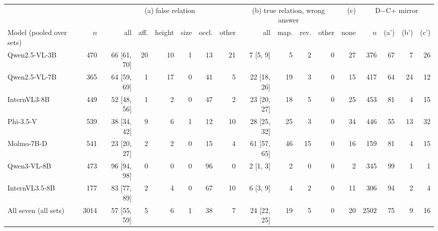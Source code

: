 \begin{tabular}{lr rrrrrr rrrr r rrrr}
\toprule
 & & \multicolumn{6}{c}{(a) false relation} & \multicolumn{4}{c}{(b) true relation, wrong answer} & (c) & \multicolumn{4}{c}{D$-$C+ mirror} \\
\cmidrule(lr){3-8}\cmidrule(lr){9-12}\cmidrule(lr){14-17}
Model (pooled over sets) & $n$ & all & aff. & height & size & occl. & other & all & map. & rev. & other & none & $n$ & (a') & (b') & (c') \\
\midrule
Qwen2.5-VL-3B & 470 & 66 [61, 70] & 20 & 10 & 1 & 13 & 21 & 7 [5, 9] & 5 & 2 & 0 & 27 & 376 & 67 & 7 & 26 \\
Qwen2.5-VL-7B & 365 & 64 [59, 69] & 1 & 17 & 0 & 41 & 5 & 22 [18, 26] & 19 & 3 & 0 & 15 & 417 & 64 & 24 & 12 \\
InternVL3-8B & 449 & 52 [48, 56] & 1 & 2 & 0 & 47 & 2 & 23 [20, 27] & 18 & 5 & 0 & 25 & 453 & 81 & 4 & 15 \\
Phi-3.5-V & 539 & 38 [34, 42] & 9 & 6 & 1 & 12 & 10 & 28 [25, 32] & 25 & 3 & 0 & 34 & 446 & 55 & 13 & 32 \\
Molmo-7B-D & 541 & 23 [20, 27] & 2 & 2 & 0 & 15 & 4 & 61 [57, 65] & 46 & 15 & 0 & 16 & 159 & 81 & 4 & 15 \\
Qwen3-VL-8B & 473 & 96 [94, 98] & 0 & 0 & 0 & 96 & 0 & 2 [1, 3] & 2 & 0 & 0 & 2 & 345 & 99 & 1 & 1 \\
InternVL3.5-8B & 177 & 83 [77, 89] & 2 & 4 & 0 & 67 & 10 & 6 [3, 9] & 4 & 2 & 0 & 11 & 306 & 94 & 2 & 4 \\
\midrule
All seven (all sets) & 3014 & 57 [55, 59] & 5 & 6 & 1 & 38 & 7 & 24 [22, 25] & 19 & 5 & 0 & 20 & 2502 & 75 & 9 & 16 \\
\bottomrule
\end{tabular}
